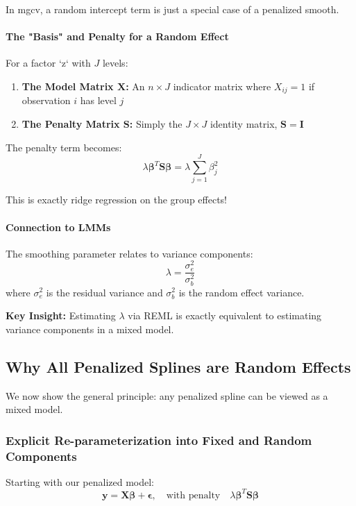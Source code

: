 \documentclass[12pt]{article}
\begin{document}
In mgcv, a random intercept term is just a special case of a penalized smooth.

\paragraph{The "Basis" and Penalty for a Random Effect}
For a factor `z` with $J$ levels:

\begin{enumerate}
    \item \textbf{The Model Matrix $\mathbf{X}$:} An $n \times J$ indicator matrix where $X_{ij} = 1$ if observation $i$ has level $j$
    
    \item \textbf{The Penalty Matrix $\mathbf{S}$:} Simply the $J \times J$ identity matrix, $\mathbf{S} = \mathbf{I}$
\end{enumerate}

The penalty term becomes:
\[ \lambda \boldsymbol{\beta}^T \mathbf{S} \boldsymbol{\beta} = \lambda \sum_{j=1}^{J} \beta_j^2 \]

This is exactly ridge regression on the group effects!

\paragraph{Connection to LMMs}
The smoothing parameter relates to variance components:
\[ \lambda = \frac{\sigma_e^2}{\sigma_b^2} \]
where $\sigma_e^2$ is the residual variance and $\sigma_b^2$ is the random effect variance.

\textbf{Key Insight:} Estimating $\lambda$ via REML is exactly equivalent to estimating variance components in a mixed model.

\subsection{Why All Penalized Splines are Random Effects}

We now show the general principle: any penalized spline can be viewed as a mixed model.

\subsubsection{Explicit Re-parameterization into Fixed and Random Components}

Starting with our penalized model:
\begin{equation*}
    \mathbf{y} = \mathbf{X}\boldsymbol{\beta} + \boldsymbol{\epsilon}, \quad \text{with penalty} \quad \lambda \boldsymbol{\beta}^T \mathbf{S} \boldsymbol{\beta}
\end{equation*}
\end{document}
